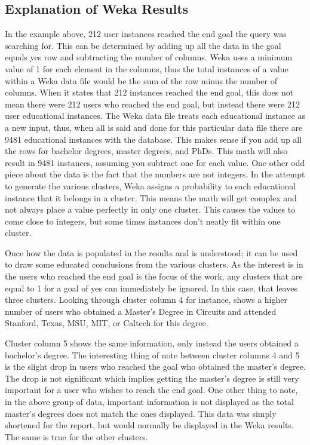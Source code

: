 \subsection{Explanation of Weka Results}
In the example above, 212 user instances reached the end goal the query was
searching for.  This can be determined by adding up all the data in the goal
equals yes row and subtracting the number of columns.  Weka uses a minimum value
of 1 for each element in the columns, thus the total instances of a value within
a Weka data file would be the sum of the row minus the number of columns.  When
it states that 212 instances reached the end goal, this does not mean there were
212 users who reached the end goal, but instead there were 212 user educational instances.
The Weka data file treats each educational instance as a new input, thus, when
all is said and done for this particular data file there are 9481 educational
instances with the database.  This makes sense if you add up all the rows for
bachelor degrees, master degrees, and PhDs.  This math will also result in 9481
instances, assuming you subtract one for each value.  One other odd piece about
the data is the fact that the numbers are not integers.  In the attempt to
generate the various clusters, Weka assigns a probability to each educational
instance that it belongs in a cluster.  This means the math will get complex and
not always place a value perfectly in only one cluster.  This causes the values
to come close to integers, but some times instances don't neatly fit within one cluster.

Once how the data is populated in the results and is understood; it can be used
to draw some educated conclusions from the various clusters.  As the interest
is in the users who reached the end goal is the focus of the work, any clusters
that are equal to 1 for a goal of yes can immediately be ignored.  In this case,
that leaves three clusters.  Looking through cluster column 4 for instance,
shows a higher number of users who obtained a Master's Degree in Circuits and
attended Stanford, Texas, MSU, MIT, or Caltech for this degree.  

Cluster column 5 shows the same information, only instead the users obtained a
bachelor's degree.  The interesting thing of note between cluster columns 4 and
5 is the slight drop in users who reached the goal who obtained the master's degree. 
The drop is not significant which implies getting the master's degree is still
very important for a user who wishes to reach the end goal.  One other thing to note,
in the above group of data, important information is not displayed as the total
master's degrees does not match the ones displayed.  This data was simply
shortened for the report, but would normally be displayed in the Weka results. 
The same is true for the other clusters.  

